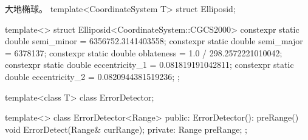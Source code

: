 \documentclass[codepkg = minted, titlestyle = lralign]{course-report}
\begin{document}
\begin{codebox*}{
  大地椭球。
}
template<CoordinateSystem T>
struct Elliposid;

template<>
struct Elliposid<CoordinateSystem::CGCS2000>
{
    constexpr static double semi_minor     = 6356752.3141403558;
    constexpr static double semi_major     = 6378137;
    constexpr static double oblateness     = 1.0 / 298.2572221010042;
    constexpr static double eccentricity_1 = 0.081819191042811;
    constexpr static double eccentricity_2 = 0.0820944381519236;
};
\end{codebox*}

\begin{codebox*}
template<class T>
class ErrorDetector;

template<>
class ErrorDetector<Range>
{
public:
    ErrorDetector(): preRange() { }
    void ErrorDetect(Range& curRange);
private:
    Range preRange;
};
\end{codebox*}

\backmatter

\nocite{*}

\makebibliography
\end{document}
